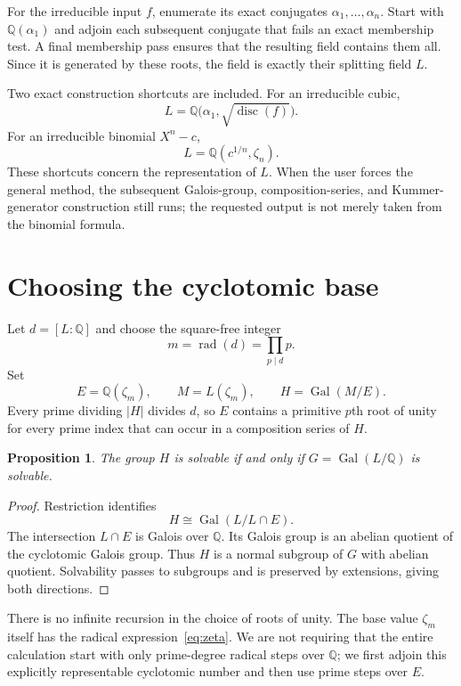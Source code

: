 \documentclass[11pt,a4paper]{article}
\newcommand{\Q}{\mathbb Q}
\newcommand{\Gal}{\operatorname{Gal}}
\newcommand{\rad}{\operatorname{rad}}
\newtheorem{proposition}[theorem]{Proposition}
\theoremstyle{definition}
\theoremstyle{remark}
\begin{document}
For the irreducible input $f$, enumerate its exact conjugates $\alpha_1,\ldots,\alpha_n$. Start with $\Q(\alpha_1)$ and adjoin each subsequent conjugate that fails an exact membership test. A final membership pass ensures that the resulting field contains them all. Since it is generated by these roots, the field is exactly their splitting field $L$.

Two exact construction shortcuts are included. For an irreducible cubic,
\[
 L=\Q\bigl(\alpha_1,\sqrt{\operatorname{disc}(f)}\bigr).
\]
For an irreducible binomial $X^n-c$,
\[
 L=\Q(c^{1/n},\zeta_n).
\]
These shortcuts concern the representation of $L$. When the user forces the general method, the subsequent Galois-group, composition-series, and Kummer-generator construction still runs; the requested output is not merely taken from the binomial formula.

\section{Choosing the cyclotomic base}\label{sec:cyclotomic}

Let $d=[L:\Q]$ and choose the square-free integer
\begin{equation}
 m=\rad(d)=\prod_{p\mid d}p.
 \label{eq:m}
\end{equation}
Set
\begin{equation}
 E=\Q(\zeta_m),\qquad M=L(\zeta_m),\qquad H=\Gal(M/E).
 \label{eq:cyclocompositum}
\end{equation}
Every prime dividing $|H|$ divides $d$, so $E$ contains a primitive $p$th root of unity for every prime index that can occur in a composition series of $H$.

\begin{proposition}\label{prop:cyclosolvable}
The group $H$ is solvable if and only if $G=\Gal(L/\Q)$ is solvable.
\end{proposition}
\begin{proof}
Restriction identifies
\[
 H\cong\Gal(L/L\cap E).
\]
The intersection $L\cap E$ is Galois over $\Q$. Its Galois group is an abelian quotient of the cyclotomic Galois group. Thus $H$ is a normal subgroup of $G$ with abelian quotient. Solvability passes to subgroups and is preserved by extensions, giving both directions.
\end{proof}

There is no infinite recursion in the choice of roots of unity. The base value $\zeta_m$ itself has the radical expression~\eqref{eq:zeta}. We are not requiring that the entire calculation start with only prime-degree radical steps over $\Q$; we first adjoin this explicitly representable cyclotomic number and then use prime steps over $E$.
\end{document}
